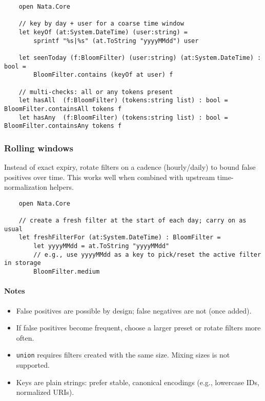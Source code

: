 \documentclass{article}
\begin{document}
\begin{verbatim}
    open Nata.Core

    // key by day + user for a coarse time window
    let keyOf (at:System.DateTime) (user:string) =
        sprintf "%s|%s" (at.ToString "yyyyMMdd") user

    let seenToday (f:BloomFilter) (user:string) (at:System.DateTime) : bool =
        BloomFilter.contains (keyOf at user) f

    // multi-checks: all or any tokens present
    let hasAll  (f:BloomFilter) (tokens:string list) : bool = BloomFilter.containsAll tokens f
    let hasAny  (f:BloomFilter) (tokens:string list) : bool = BloomFilter.containsAny tokens f
\end{verbatim}

\subsubsection{Rolling windows}
Instead of exact expiry, rotate filters on a cadence (hourly/daily) to bound false positives over time. This works well when combined with upstream time-normalization helpers.

\begin{verbatim}
    open Nata.Core

    // create a fresh filter at the start of each day; carry on as usual
    let freshFilterFor (at:System.DateTime) : BloomFilter =
        let yyyyMMdd = at.ToString "yyyyMMdd"
        // e.g., use yyyyMMdd as a key to pick/reset the active filter in storage
        BloomFilter.medium
\end{verbatim}

\paragraph{Notes}
\begin{itemize}
  \item False positives are possible by design; false negatives are not (once added).
  \item If false positives become frequent, choose a larger preset or rotate filters more often.
  \item \texttt{union} requires filters created with the same size. Mixing sizes is not supported.
  \item Keys are plain strings: prefer stable, canonical encodings (e.g., lowercase IDs, normalized URIs).
\end{itemize}
\end{document}
